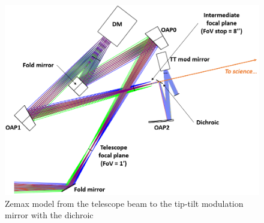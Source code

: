 \documentclass[12pt,a4paper]{article}
\begin{document}
\begin{figure}[H]
	\begin{center}
		\includegraphics[width=.6\textwidth]{images/Zemax_model_FP_TTmod_fold_2nd_approach.PNG}
		\caption{Zemax model from the telescope beam to the tip-tilt modulation mirror with the dichroic}\label{fig:Zemax_model_FP_TTmod_fold_2nd_approach}
	\end{center}
\end{figure}
\end{document}
